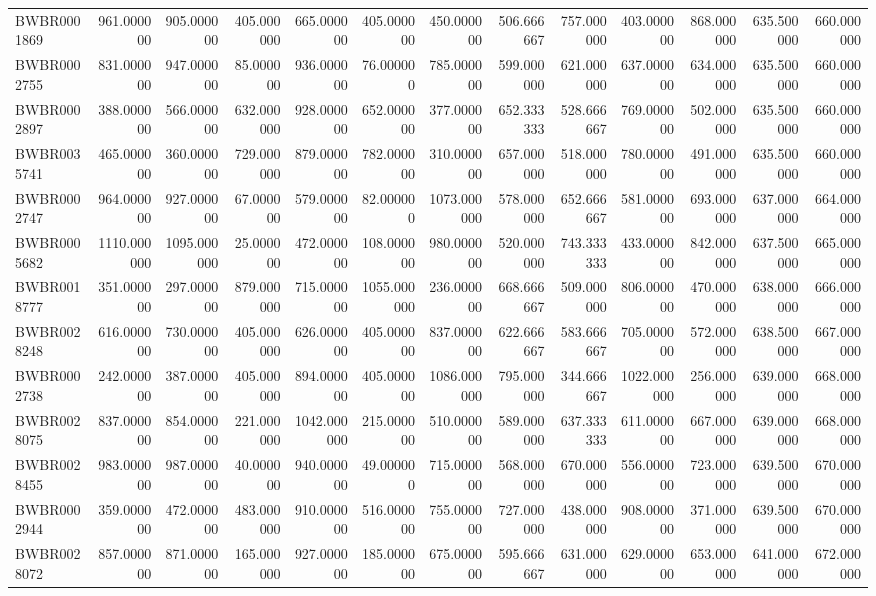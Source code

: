 \begin{longtable}{lrrrrrrrrrrrr}
BWBR0001869 & 961.000000 & 905.000000 & 405.000000 & 665.000000 & 405.000000 & 450.000000 & 506.666667 & 757.000000 & 403.000000 & 868.000000 & 635.500000 & 660.000000 \\
BWBR0002755 & 831.000000 & 947.000000 & 85.000000 & 936.000000 & 76.000000 & 785.000000 & 599.000000 & 621.000000 & 637.000000 & 634.000000 & 635.500000 & 660.000000 \\
BWBR0002897 & 388.000000 & 566.000000 & 632.000000 & 928.000000 & 652.000000 & 377.000000 & 652.333333 & 528.666667 & 769.000000 & 502.000000 & 635.500000 & 660.000000 \\
BWBR0035741 & 465.000000 & 360.000000 & 729.000000 & 879.000000 & 782.000000 & 310.000000 & 657.000000 & 518.000000 & 780.000000 & 491.000000 & 635.500000 & 660.000000 \\
BWBR0002747 & 964.000000 & 927.000000 & 67.000000 & 579.000000 & 82.000000 & 1073.000000 & 578.000000 & 652.666667 & 581.000000 & 693.000000 & 637.000000 & 664.000000 \\
BWBR0005682 & 1110.000000 & 1095.000000 & 25.000000 & 472.000000 & 108.000000 & 980.000000 & 520.000000 & 743.333333 & 433.000000 & 842.000000 & 637.500000 & 665.000000 \\
BWBR0018777 & 351.000000 & 297.000000 & 879.000000 & 715.000000 & 1055.000000 & 236.000000 & 668.666667 & 509.000000 & 806.000000 & 470.000000 & 638.000000 & 666.000000 \\
BWBR0028248 & 616.000000 & 730.000000 & 405.000000 & 626.000000 & 405.000000 & 837.000000 & 622.666667 & 583.666667 & 705.000000 & 572.000000 & 638.500000 & 667.000000 \\
BWBR0002738 & 242.000000 & 387.000000 & 405.000000 & 894.000000 & 405.000000 & 1086.000000 & 795.000000 & 344.666667 & 1022.000000 & 256.000000 & 639.000000 & 668.000000 \\
BWBR0028075 & 837.000000 & 854.000000 & 221.000000 & 1042.000000 & 215.000000 & 510.000000 & 589.000000 & 637.333333 & 611.000000 & 667.000000 & 639.000000 & 668.000000 \\
BWBR0028455 & 983.000000 & 987.000000 & 40.000000 & 940.000000 & 49.000000 & 715.000000 & 568.000000 & 670.000000 & 556.000000 & 723.000000 & 639.500000 & 670.000000 \\
BWBR0002944 & 359.000000 & 472.000000 & 483.000000 & 910.000000 & 516.000000 & 755.000000 & 727.000000 & 438.000000 & 908.000000 & 371.000000 & 639.500000 & 670.000000 \\
BWBR0028072 & 857.000000 & 871.000000 & 165.000000 & 927.000000 & 185.000000 & 675.000000 & 595.666667 & 631.000000 & 629.000000 & 653.000000 & 641.000000 & 672.000000 \\

\end{longtable}
